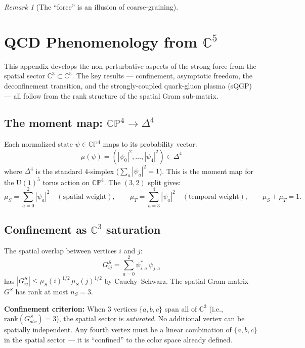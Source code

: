 \documentclass[12pt]{article}
\theoremstyle{remark}
\newtheorem{remark}[theorem]{Remark}
\theoremstyle{definition}
\newcommand{\CC}{\mathbb{C}}
\begin{document}
\begin{remark}[The ``force'' is an illusion of coarse-graining]
\section{QCD Phenomenology from $\CC^5$}
\label{app:qcd}

This appendix develops the non-perturbative aspects of the strong force from the spatial sector $\CC^3 \subset \CC^5$. The key results --- confinement, asymptotic freedom, the deconfinement transition, and the strongly-coupled quark-gluon plasma (sQGP) --- all follow from the rank structure of the spatial Gram sub-matrix.

\subsection{The moment map: $\mathbb{CP}^4 \to \Delta^4$}

Each normalized state $\psi \in \mathbb{CP}^4$ maps to its probability vector:
\begin{equation}
\mu(\psi) = (|\psi_0|^2, \ldots, |\psi_4|^2) \in \Delta^4
\end{equation}
where $\Delta^4$ is the standard 4-simplex ($\sum_a |\psi_a|^2 = 1$). This is the moment map for the $\text{U}(1)^5$ torus action on $\mathbb{CP}^4$. The $(3,2)$ split gives:
\begin{equation}
\mu_S = \sum_{a=0}^{2}|\psi_a|^2 \quad (\text{spatial weight}), \qquad \mu_T = \sum_{a=3}^{4}|\psi_a|^2 \quad (\text{temporal weight}), \qquad \mu_S + \mu_T = 1.
\end{equation}

\subsection{Confinement as $\CC^3$ saturation}

The spatial overlap between vertices $i$ and $j$:
\begin{equation}
G^S_{ij} = \sum_{a=0}^{2} \psi^*_{i,a}\,\psi_{j,a}
\end{equation}
has $|G^S_{ij}| \leq \mu_S(i)^{1/2}\,\mu_S(j)^{1/2}$ by Cauchy--Schwarz. The spatial Gram matrix $G^S$ has rank at most $n_S = 3$.

\textbf{Confinement criterion:} When 3 vertices $\{a, b, c\}$ span all of $\CC^3$ (i.e., $\text{rank}(G^S_{abc}) = 3$), the spatial sector is \emph{saturated}. No additional vertex can be spatially independent. Any fourth vertex must be a linear combination of $\{a, b, c\}$ in the spatial sector --- it is ``confined'' to the color space already defined.


\end{remark}
\end{document}
